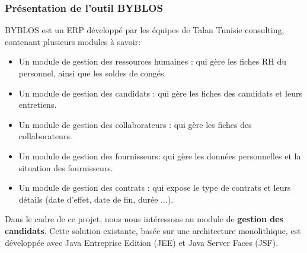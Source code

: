 \subsubsection{Présentation de l'outil BYBLOS}
BYBLOS est un ERP développé par les équipes de Talan Tunisie consulting, contenant plusieurs modules à savoir:
\color{black}
\begin{itemize}
    \item Un module de gestion des ressources humaines : qui gère les fiches RH du personnel, ainsi que les soldes de congés.
    \item Un module de gestion des candidats : qui gère les fiches des candidats et leurs entretiens.
    \item Un module de gestion des collaborateurs : qui gère les fiches des collaborateurs.
    \item Un module de gestion des fournisseurs: qui gère les données personnelles et la situation des fournisseurs.
    \item Un module de gestion des contrats : qui expose le type de contrats et leurs détails (date d'effet, date de fin, durée $\dots{}$).
    
\end{itemize}
Dans le cadre de ce projet, nous nous intéressons au module de \textbf{gestion des candidats}.
Cette solution existante, basée sur une architecture monolithique, est développée avec Java Entreprise Edition (JEE) et Java Server Faces (JSF).
